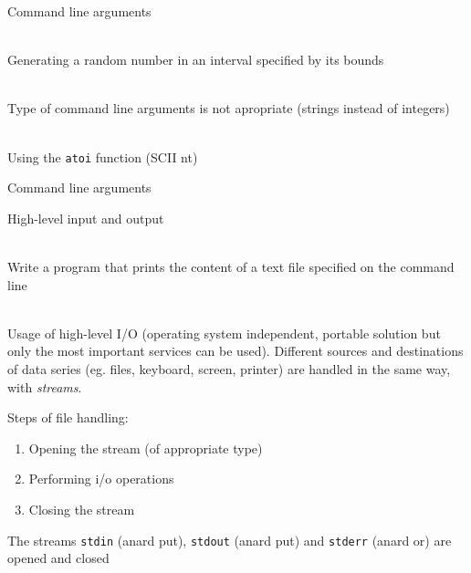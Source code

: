 \documentclass[usenames,dvipsnames,aspectratio=169]{beamer}
\begin{document}
\begin{frame}{Command line arguments}
  \begin{description}[mm]
    \item[Task] \hfill \\ Generating a random number in an interval specified by its bounds
    \item[Problem] \hfill \\ Type of command line arguments is not apropriate (strings instead of integers)
    \item[Solution] \hfill \\ Using the \texttt{atoi} function (SCII nt)
  \end{description}
\end{frame}

\begin{frame}{Command line arguments}
  \begin{exampleblock}{}
    \scriptsize
    
  \end{exampleblock}
\end{frame}

\begin{frame}{High-level input and output}
  \begin{description}[mm]
    \item[Task] \hfill \\
      Write a program that prints the content of a text file specified on the command line
    \item[Solution] \hfill \\
      Usage of high-level I/O (operating system independent, portable solution but only the most important services can be used). Different sources and destinations of data series (eg. files, keyboard, screen, printer) are handled in the same way, with \emph{streams}.
  \end{description}
  Steps of file handling:
  \begin{enumerate}
    \item Opening the stream (of appropriate type)
    \item Performing i/o operations
    \item Closing the stream
  \end{enumerate}
  \footnotesize
  The streams \texttt{stdin} (anard put), \texttt{stdout} (anard put) and \texttt{stderr} (anard or) are  opened and closed
\end{frame}
\end{document}
